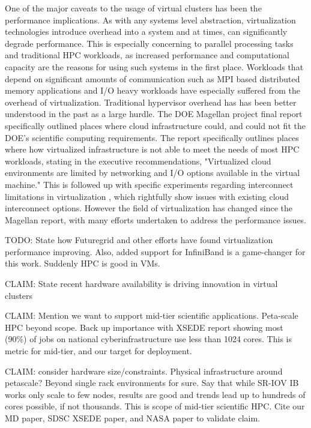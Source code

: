 
One of the major caveats to the usage of virtual clusters has been the performance implications. As with any systems level abstraction, virtualization technologies introduce overhead into a system and at times, can significantly degrade performance. This is especially concerning to parallel processing tasks and traditional HPC workloads, as increased performance and computational capacity are the reasons for using such systems in the first place. Workloads that depend on significant amounts of communication such as MPI based distributed memory applications and I/O heavy workloads have especially suffered from the overhead of virtualization. Traditional hypervisor overhead has has been better understood in the past as a large hurdle. The DOE Magellan project final report \cite{MagellanFinal} specifically outlined places where cloud infrastructure could, and could not fit the DOE's scientific computing requirements. The report specifically outlines places where how virtualized infrastructure is not able to meet the needs of most HPC workloads, stating in the executive recommendations, "Virtualized cloud environments are limited by networking and I/O options available in the virtual machine." This is followed up with specific experiments regarding interconnect limitations in virtualization \cite{Ramakrishnan2012}, which rightfully show issues with existing cloud interconnect options.  However the field of virtualization has changed since the Magellan report, with many efforts undertaken to address the performance issues. 

TODO: State how Futuregrid and other efforts have found virtualization performance improving. Also, added support for InfiniBand is a game-changer for this work. Suddenly HPC is good in VMs.

\cite{hazelhurst2008scientific}
\cite{Luszczek:2011:EHC}
\cite{fox2013futuregrid}
\cite{jose2013sr}
\cite{Musleh2014cloud}

CLAIM: State recent hardware availability is driving innovation in virtual clusters

CLAIM: Mention we want to support mid-tier scientific applications. Peta-scale HPC beyond scope. Back up importance with XSEDE report showing most (90\%) of jobs on national cyberinfrastructure use less than 1024 cores. This is metric for mid-tier, and our target for deployment.  

CLAIM: consider hardware size/constraints. Physical infrastructure around petascale? Beyond single rack environments for sure. Say that while SR-IOV IB works only scale to few nodes, results are good and trends lead up to hundreds of cores possible, if not thousands. This is scope of mid-tier scientific HPC. Cite our MD paper, SDSC XSEDE paper, and NASA paper to validate claim.



